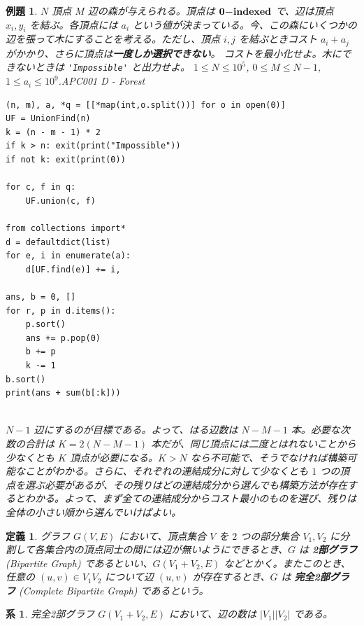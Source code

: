 \documentclass[12pt, a4j]{ltjsarticle}
\newtheorem{defi}[thm]{定義}
\newtheorem{cor}[thm]{系}
\newtheorem{exm}[thm]{例題}
\newcommand*{\SS}{\vspace{1cm}}
\newcommand{\bm}[1]{{\mbox{\boldmath $#1$}}}
\begin{document}
\SS

\begin{exm} $N$ 頂点 $M$ 辺の森が与えられる。頂点は $\bm{0{\rm -indexed}}$ \upshape で、辺は頂点 $x_i,y_i$ を結ぶ。各頂点には $a_i$ という値が決まっている。今、この森にいくつかの辺を張って木にすることを考える。ただし、頂点 $i,j$ を結ぶときコスト $a_i+a_j$ がかかり、さらに頂点は{\bf 一度しか選択できない}。 コストを最小化せよ。木にできないときは \lstinline{'Impossible'} と出力せよ。
$1\le N\le 10^5$, $0\le M\le N-1$, $1\le a_i\le 10^9$.\quad APC001 D - Forest\\
\begin{lstlisting}
(n, m), a, *q = [[*map(int,o.split())] for o in open(0)]
UF = UnionFind(n)
k = (n - m - 1) * 2
if k > n: exit(print("Impossible"))
if not k: exit(print(0))

for c, f in q:
    UF.union(c, f)

from collections import*
d = defaultdict(list)
for e, i in enumerate(a):
    d[UF.find(e)] += i,

ans, b = 0, []
for r, p in d.items():
    p.sort()
    ans += p.pop(0)
    b += p
    k -= 1
b.sort()
print(ans + sum(b[:k]))
\end{lstlisting}\quad\\
$N-1$ 辺にするのが目標である。よって、はる辺数は $N-M-1$ 本。必要な次数の合計は $K=2(N-M-1)$ 本だが、同じ頂点には二度とはれないことから少なくとも $K$ 頂点が必要になる。$K > N$ なら不可能で、そうでなければ構築可能なことがわかる。さらに、それぞれの連結成分に対して少なくとも $1$ つの頂点を選ぶ必要があるが、その残りはどの連結成分から選んでも構築方法が存在するとわかる。よって、まず全ての連結成分からコスト最小のものを選び、残りは全体の小さい順から選んでいけばよい。
\end{exm}

\SS

\begin{defi}
グラフ $G(V,E)$ において、頂点集合 $V$ を $2$ つの部分集合 $V_1,V_2$ に分割して各集合内の頂点同士の間には辺が無いようにできるとき、$G$ は {\bf 2部グラフ} (Bipartite Graph) であるといい、$G(V_1+V_2,E)$ などとかく。またこのとき、任意の $(u,v)\in V_1V_2$ について辺 $(u,v)$ が存在するとき、$G$ は {\bf 完全2部グラフ} (Complete Bipartite Graph) であるという。
\end{defi}

\SS

\begin{cor}
完全2部グラフ $G(V_1+V_2,E)$ において、辺の数は $|V_1||V_2|$ である。
\end{cor}
\end{document}

